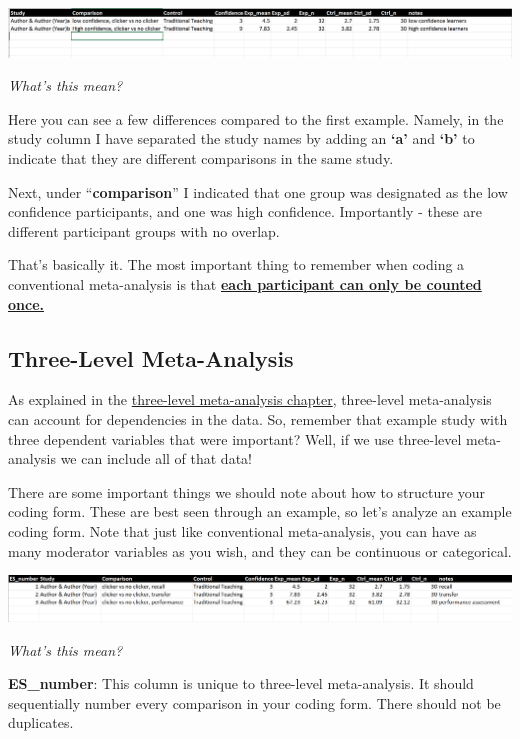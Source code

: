 \documentclass[
]{book}
\begin{document}
\includegraphics[width=2\textwidth,height=\textheight]{images/meta2.PNG}

\emph{What's this mean?}

Here you can see a few differences compared to the first example. Namely, in the study column I have separated the study names by adding an \textbf{`a'} and \textbf{`b'} to indicate that they are different comparisons in the same study.

Next, under ``\textbf{comparison}'' I indicated that one group was designated as the low confidence participants, and one was high confidence. Importantly - these are different participant groups with no overlap.

That's basically it. The most important thing to remember when coding a conventional meta-analysis is that \ul{\textbf{each participant can only be counted once.}}

\hypertarget{three-level-meta-analysis}{%
\subsection{Three-Level Meta-Analysis}\label{three-level-meta-analysis}}

As explained in the \protect\hyperlink{3LMA}{three-level meta-analysis chapter}, three-level meta-analysis can account for dependencies in the data. So, remember that example study with three dependent variables that were important? Well, if we use three-level meta-analysis we can include all of that data!

There are some important things we should note about how to structure your coding form. These are best seen through an example, so let's analyze an example coding form. Note that just like conventional meta-analysis, you can have as many moderator variables as you wish, and they can be continuous or categorical.

\includegraphics[width=2\textwidth,height=\textheight]{images/3lmacoding.PNG}

\emph{What's this mean?}

\textbf{ES\_number}: This column is unique to three-level meta-analysis. It should sequentially number every comparison in your coding form. There should not be duplicates.
\end{document}
